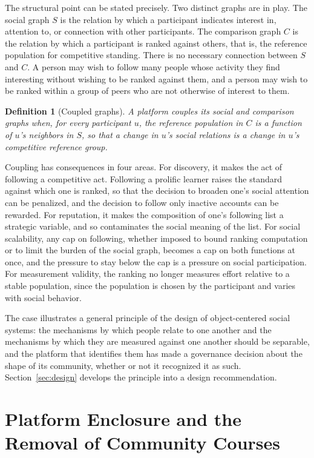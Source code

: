 \documentclass[11pt]{article}
\newtheorem{definition}{Definition}
\theoremstyle{remark}
\begin{document}
The structural point can be stated precisely. Two distinct graphs are in play. The social graph $S$ is the relation by which a participant indicates interest in, attention to, or connection with other participants. The comparison graph $C$ is the relation by which a participant is ranked against others, that is, the reference population for competitive standing. There is no necessary connection between $S$ and $C$. A person may wish to follow many people whose activity they find interesting without wishing to be ranked against them, and a person may wish to be ranked within a group of peers who are not otherwise of interest to them.

\begin{definition}[Coupled graphs]
A platform \emph{couples} its social and comparison graphs when, for every participant $u$, the reference population in $C$ is a function of $u$'s neighbors in $S$, so that a change in $u$'s social relations is a change in $u$'s competitive reference group.
\end{definition}

Coupling has consequences in four areas. For discovery, it makes the act of following a competitive act. Following a prolific learner raises the standard against which one is ranked, so that the decision to broaden one's social attention can be penalized, and the decision to follow only inactive accounts can be rewarded. For reputation, it makes the composition of one's following list a strategic variable, and so contaminates the social meaning of the list. For social scalability, any cap on following, whether imposed to bound ranking computation or to limit the burden of the social graph, becomes a cap on both functions at once, and the pressure to stay below the cap is a pressure on social participation. For measurement validity, the ranking no longer measures effort relative to a stable population, since the population is chosen by the participant and varies with social behavior.

The case illustrates a general principle of the design of object-centered social systems: the mechanisms by which people relate to one another and the mechanisms by which they are measured against one another should be separable, and the platform that identifies them has made a governance decision about the shape of its community, whether or not it recognized it as such. Section~\ref{sec:design} develops the principle into a design recommendation.

\section{Platform Enclosure and the Removal of Community Courses}
\label{sec:enclosure}
\end{document}
